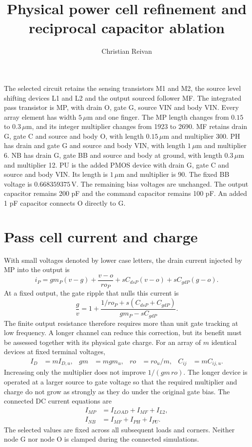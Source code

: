 \documentclass{article}
\begin{document}
\title{Physical power cell refinement and reciprocal capacitor ablation}
\author{Christian Reivan}
\maketitle
The selected circuit retains the sensing transistors M1 and M2, the
source level shifting devices L1 and L2 and the output sourced follower
MF. The integrated pass transistor is MP, with drain O, gate G, source
VIN and body VIN. Every array element has width $5\,\mu\mathrm m$ and
one finger. The MP length changes from $0.15$ to $0.3\,\mu\mathrm m$,
and its integer multiplier changes from 1923 to 2690. MF retains drain G,
gate C and source and body O, with length $0.15\,\mu\mathrm m$ and
multiplier 300. PH has drain and gate G and source and body VIN, with
length $1\,\mu\mathrm m$ and multiplier 6. NB has drain G, gate BB and
source and body at ground, with length $0.3\,\mu\mathrm m$ and multiplier 12.
PU is the added PMOS device with drain G, gate C and source and body VIN.
Its length is $1\,\mu\mathrm m$ and multiplier is 90. The fixed BB voltage
is $0.668359375\,\mathrm V$. The remaining bias voltages are unchanged.
The output capacitor remains 200 pF and the command capacitor remains 100 pF.
An added 1 pF capacitor connects O directly to G.

\section*{Pass cell current and charge}
With small voltages denoted by lower case letters, the drain current
injected by MP into the output is
\begin{equation}
i_P=gm_P(v-g)+\frac{v-o}{ro_P}
 +sC_{dsP}(v-o)+sC_{gdP}(g-o).
\end{equation}
At a fixed output, the gate ripple that nulls this current is
\begin{equation}
\frac{g}{v}=1+
\frac{1/ro_P+s(C_{dsP}+C_{gdP})}{gm_P-sC_{gdP}}.
\end{equation}
The finite output resistance therefore requires more than unit gate
tracking at low frequency. A longer channel can reduce this correction,
but its benefit must be assessed together with its physical gate charge.
For an array of $m$ identical devices at fixed terminal voltages,
\begin{align}
I_D&=m I_{D,u},&gm&=m gm_u,&ro&=ro_u/m,&C_{ij}&=mC_{ij,u}.
\end{align}
Increasing only the multiplier does not improve $1/(gm\,ro)$.
The longer device is operated at a larger source to gate voltage so that
the required multiplier and charge do not grow as strongly as they do
under the original gate bias. The connected DC current equations are
\begin{align}
I_{MP}&=I_{LOAD}+I_{MF}+I_{L2},\\
I_{NB}&=I_{MF}+I_{PH}+I_{PU}.
\end{align}
The selected values are fixed across all subsequent loads and corners.
Neither node G nor node O is clamped during the connected simulations.
\end{document}
